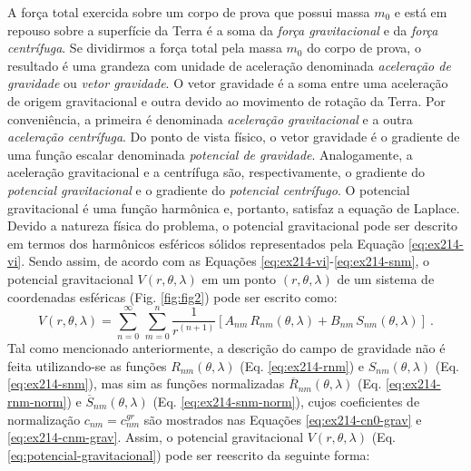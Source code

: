 \documentclass[10pt,a4paper,fleqn]{article}
\begin{document}
A for\c{c}a total exercida sobre um corpo de prova que possui massa $m_{0}$ e est\'{a} em
repouso sobre a superf\'{i}cie da Terra \'{e} a soma da \textit{for\c{c}a 
gravitacional} e da \textit{for\c{c}a centr\'{i}fuga}.
Se dividirmos a for\c{c}a total pela massa $m_{0}$ do corpo de prova, o resultado
\'{e} uma grandeza com unidade de acelera\c{c}\~{a}o denominada \textit{acelera\c{c}\~{a}o
de gravidade} ou \textit{vetor gravidade}.
O vetor gravidade \'{e} a soma entre uma acelera\c{c}\~{a}o de origem gravitacional 
e outra devido ao movimento de rota\c{c}\~{a}o da Terra. Por conveni\^{e}ncia,
a primeira \'{e} denominada \textit{acelera\c{c}\~{a}o gravitacional} e a outra 
\textit{acelera\c{c}\~{a}o centr\'{i}fuga}.
Do ponto de vista f\'{i}sico, o vetor gravidade \'{e} o gradiente de uma fun\c{c}\~{a}o
escalar denominada \textit{potencial de gravidade}. 
Analogamente, a acelera\c{c}\~{a}o gravitacional e a centr\'{i}fuga s\~{a}o, 
respectivamente, o gradiente do \textit{potencial gravitacional} e o gradiente 
do \textit{potencial centr\'{i}fugo}.
O potencial gravitacional \'{e} uma fun\c{c}\~{a}o harm\^{o}nica e, portanto,
satisfaz a equa\c{c}\~{a}o de Laplace.
Devido a natureza f\'{i}sica do problema, o potencial gravitacional pode ser descrito
em termos dos harm\^{o}nicos esf\'{e}ricos s\'{o}lidos representados pela Equa\c{c}\~{a}o 
\ref{eq:ex214-vi}. Sendo assim, de acordo com as Equa\c{c}\~{o}es 
\ref{eq:ex214-vi}-\ref{eq:ex214-snm}, o potencial gravitacional $V(r, \theta, \lambda)$
em um ponto $(r, \theta, \lambda)$ de um sistema de coordenadas esf\'{e}ricas (Fig. \ref{fig:fig2})
pode ser escrito como:
\begin{equation}
V(r, \theta, \lambda) = \sum_{n=0}^{\infty} \, \sum_{m=0}^{n} 
\frac{1}{r^{(n+1)}} \left[ 
A_{nm} \, R_{nm}(\theta, \lambda) +
B_{nm} \, S_{nm}(\theta, \lambda)
\right] \: .
\label{eq:potencial-gravitacional}
\end{equation}
Tal como mencionado anteriormente, a descri\c{c}\~{a}o do campo de gravidade 
n\~{a}o \'{e} feita utilizando-se as fun\c{c}\~{o}es 
$R_{nm}(\theta, \lambda)$ (Eq. \ref{eq:ex214-rnm}) e $S_{nm}(\theta, \lambda)$ 
(Eq. \ref{eq:ex214-snm}), mas sim as fun\c{c}\~{o}es normalizadas
$\overline{R}_{nm}(\theta,\lambda)$ (Eq. \ref{eq:ex214-rnm-norm}) e
$\overline{S}_{nm}(\theta,\lambda)$ (Eq. \ref{eq:ex214-snm-norm}), cujos
coeficientes de normaliza\c{c}\~{a}o $c_{nm} = c_{nm}^{gr}$ s\~{a}o mostrados
nas Equa\c{c}\~{o}es \ref{eq:ex214-cn0-grav} e \ref{eq:ex214-cnm-grav}.
Assim, o potencial gravitacional $V(r, \theta, \lambda)$ (Eq. 
\ref{eq:potencial-gravitacional}) pode ser reescrito da seguinte forma:
\end{document}
